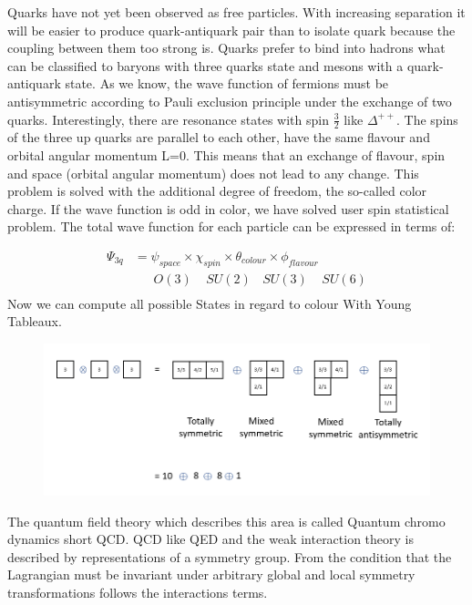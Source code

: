Quarks have not yet been observed as free particles. With increasing separation it will be easier to produce quark-antiquark pair than to isolate quark because the coupling between them too strong is.
Quarks prefer to bind into hadrons what can be classified to baryons with three quarks state and mesons with a quark-antiquark state.
As we know, the wave function of fermions must be antisymmetric according to Pauli exclusion principle under the exchange of two quarks. Interestingly, there are resonance states with spin $ \frac{3}{2} $ like $ {\Delta}^{++} $.
The spins of the three up quarks are parallel to each other, have the same flavour and orbital angular momentum L=0. This means that an exchange of flavour, spin and space (orbital angular momentum) does not lead to any change. This problem is solved with the additional degree of freedom, the so-called color charge. If the wave function is odd in color, we have solved user spin statistical problem.
The total wave function for each particle can be expressed in terms of:

\begin{equation}
\begin{split}
\Psi_{3q} &= \psi_{space} \times \chi_{spin} \times \theta_{colour} \times \phi_{flavour} \\
&\:\:\:\:\:\:\:O(3) \:\:\:\:\: SU(2)\:\:\:\: SU(3)\:\:\:\:\: SU(6)\\
\end{split}
\end{equation}
Now we can compute all possible States in regard to colour With Young Tableaux.
\begin{figure}[h!]
\centering
\includegraphics[scale=0.7]{images/Young.png}
\end{figure}



The quantum field theory which describes this area is called Quantum chromo dynamics short QCD.
QCD like QED and the weak interaction theory is described by representations of a symmetry group. From the condition that the Lagrangian must be invariant under arbitrary global and local symmetry transformations follows the interactions terms.

\newpage